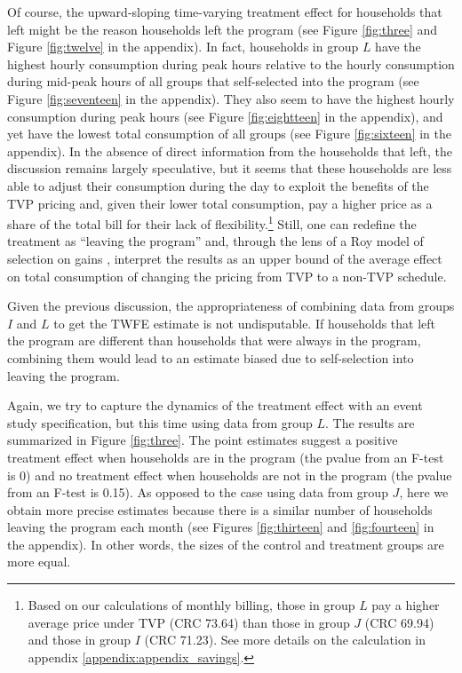 \documentclass[12pt]{article}
\begin{document}
Of course, the upward-sloping time-varying treatment effect for households that left might be the reason households left the program (see Figure \ref{fig:three} and Figure \ref{fig:twelve} in the appendix). In fact, households in group $L$ have the highest hourly consumption during peak hours relative to the hourly consumption during mid-peak hours of all groups that self-selected into the program (see Figure \ref{fig:seventeen} in the appendix). They also seem to have the highest hourly consumption during peak hours (see Figure \ref{fig:eightteen} in the appendix), and yet have the lowest total consumption of all groups (see Figure \ref{fig:sixteen} in the appendix). In the absence of direct information from the households that left, the discussion remains largely speculative, but it seems that these households are less able to adjust their consumption during the day to exploit the benefits of the TVP pricing and, given their lower total consumption, pay a higher price as a share of the total bill for their lack of flexibility.\footnote{Based on our calculations of monthly billing, those in group $L$ pay a higher average price under TVP (CRC 73.64) than those in group $J$ (CRC 69.94) and those in group $I$ (CRC 71.23). See more details on the calculation in appendix \ref{appendix:appendix_savings}.} Still, one can redefine the treatment as \enquote{leaving the program} and, through the lens of a Roy model of selection on gains \citep{heckmanChapter70Econometric2007}, interpret the results as an upper bound of the average effect on total consumption of changing the pricing from TVP to a non-TVP schedule.

Given the previous discussion, the appropriateness of combining data from groups  $I$ and $L$ to get the TWFE estimate is not undisputable. If households that left the program are different than households that were always in the program, combining them would lead to an estimate biased due to self-selection into leaving the program.

Again, we try to capture the dynamics of the treatment effect with an event study specification, but this time using data from group $L$. The results are summarized in Figure \ref{fig:three}. The point estimates suggest a positive treatment effect when households are in the program (the pvalue from an F-test is 0) and no treatment effect when households are not in the program (the pvalue from an F-test is 0.15). As opposed to the case using data from group  $J$, here we obtain more precise estimates because there is a similar number of households leaving the program each month (see Figures \ref{fig:thirteen} and \ref{fig:fourteen} in the appendix). In other words, the sizes of the control and treatment groups are more equal.
\end{document}
